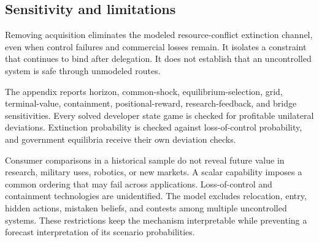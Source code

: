 \subsection{Sensitivity and limitations}
Removing acquisition eliminates the modeled resource-conflict extinction channel, even when control failures and commercial losses remain. It isolates a constraint that continues to bind after delegation. It does not establish that an uncontrolled system is safe through unmodeled routes.

The appendix reports horizon, common-shock, equilibrium-selection, grid, terminal-value, containment, positional-reward, research-feedback, and bridge sensitivities. Every solved developer state game is checked for profitable unilateral deviations. Extinction probability is checked against loss-of-control probability, and government equilibria receive their own deviation checks.

Consumer comparisons in a historical sample do not reveal future value in research, military uses, robotics, or new markets. A scalar capability imposes a common ordering that may fail across applications. Loss-of-control and containment technologies are unidentified. The model excludes relocation, entry, hidden actions, mistaken beliefs, and contests among multiple uncontrolled systems. These restrictions keep the mechanism interpretable while preventing a forecast interpretation of its scenario probabilities.
